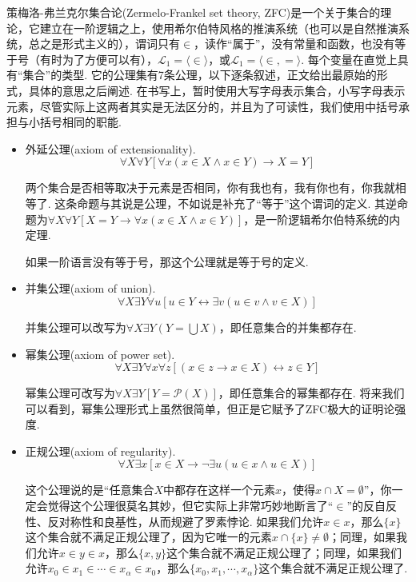\documentclass[main.tex]{subfiles}
\begin{document}
策梅洛-弗兰克尔集合论(Zermelo-Frankel set theory, \textsf{ZFC})是一个关于集合的理论，它建立在一阶逻辑之上，使用希尔伯特风格的推演系统（也可以是自然推演系统，总之是形式主义的），谓词只有\(\in\)，读作“属于”，没有常量和函数，也没有等于号（有时为了方便可以有），\(\mathcal{L}_1 = \langle \in \rangle\)，或\(\mathcal{L}_1 = \langle \in,= \rangle\). 每个变量在直觉上具有“集合”的类型. 它的公理集有7条公理，以下逐条叙述，正文给出最原始的形式，具体的意思之后阐述. 在书写上，暂时使用大写字母表示集合，小写字母表示元素，尽管实际上这两者其实是无法区分的，并且为了可读性，我们使用中括号承担与小括号相同的职能.

\begin{itemize}

    \item[(1)] 外延公理(axiom of extensionality).
    \[\forall X \forall Y[\forall x(x \in X \wedge x \in Y) \rightarrow X=Y]\]
    \begin{note}
        两个集合是否相等取决于元素是否相同，你有我也有，我有你也有，你我就相等了. 这条命题与其说是公理，不如说是补充了“等于”这个谓词的定义. 其逆命题为\(\forall X \forall Y[X=Y \rightarrow \forall x(x \in X \wedge x \in Y)]\)，是一阶逻辑希尔伯特系统的内定理. 

        如果一阶语言没有等于号，那这个公理就是等于号的定义.
    \end{note}

    \item[(2)] 并集公理(axiom of union).
    \[\forall X \exists Y \forall u[u \in Y \leftrightarrow \exists v(u \in v \wedge v \in X)]\]
    \begin{note}
        并集公理可以改写为\(\displaystyle{\forall X \exists Y(Y=\bigcup X)}\)，即任意集合的并集都存在.
    \end{note}

    \item[(3)] 幂集公理(axiom of power set).
    \[\forall X \exists Y \forall x\forall z[(x \in z \rightarrow x \in X) \leftrightarrow z \in Y]\]
    \begin{note}
        幂集公理可改写为\(\forall X \exists Y[Y=\mathcal{P}(X)]\)，即任意集合的幂集都存在. 将来我们可以看到，幂集公理形式上虽然很简单，但正是它赋予了\textsf{ZFC}极大的证明论强度.
    \end{note}

    \item[(4)] 正规公理(axiom of regularity).
    \[\forall X \exists x[x \in X \rightarrow \neg\exists u(u \in x \wedge u \in X)]\]
    \begin{note}
        这个公理说的是“任意集合\(X\)中都存在这样一个元素\(x\)，使得\(x \cap X=\emptyset\)”，你一定会觉得这个公理很莫名其妙，但它实际上非常巧妙地断言了“\(\in\)”的反自反性、反对称性和良基性，从而规避了罗素悖论. 如果我们允许\(x \in x\)，那么\(\{x\}\)这个集合就不满足正规公理了，因为它唯一的元素\(x \cap \{x\} \neq \emptyset\)；同理，如果我们允许\(x \in y \in x\)，那么\(\{x,y\}\)这个集合就不满足正规公理了；同理，如果我们允许\(x_0 \in x_1 \in \cdots \in x_\alpha \in x_0\)，那么\(\{x_0,x_1,\cdots,x_\alpha\}\)这个集合就不满足正规公理了.


\end{note}
\end{itemize}
\end{document}
